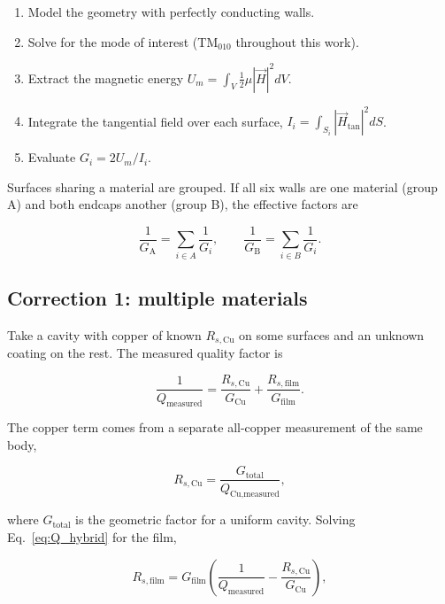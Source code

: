 \begin{enumerate}
    \item Model the geometry with perfectly conducting walls.
    \item Solve for the mode of interest (TM$_{010}$ throughout this work).
    \item Extract the magnetic energy $U_m = \int_V \tfrac{1}{2}\mu|\vec{H}|^2 dV$.
    \item Integrate the tangential field over each surface, $I_i = \int_{S_i} |\vec{H}_\text{tan}|^2 dS$.
    \item Evaluate $G_i = 2U_m / I_i$.
\end{enumerate}

Surfaces sharing a material are grouped. If all six walls are one material (group A) and both endcaps another (group B), the effective factors are

\begin{equation}
\frac{1}{G_\text{A}} = \sum_{i \in A} \frac{1}{G_i}, \qquad \frac{1}{G_\text{B}} = \sum_{i \in B} \frac{1}{G_i}.
\label{eq:G_grouped}
\end{equation}

\subsection{Correction 1: multiple materials}

Take a cavity with copper of known $R_{s,\text{Cu}}$ on some surfaces and an unknown coating on the rest. The measured quality factor is

\begin{equation}
    \frac{1}{Q_\text{measured}} = \frac{R_{s,\text{Cu}}}{G_\text{Cu}} + \frac{R_{s,\text{film}}}{G_\text{film}}.
    \label{eq:Q_hybrid}
\end{equation}

The copper term comes from a separate all-copper measurement of the same body,

\begin{equation}
R_{s,\text{Cu}} = \frac{G_\text{total}}{Q_\text{Cu,measured}},
\label{eq:Rs_Cu}
\end{equation}

where $G_\text{total}$ is the geometric factor for a uniform cavity. Solving Eq.~\ref{eq:Q_hybrid} for the film,

\begin{equation}
R_{s,\text{film}} = G_\text{film} \left(\frac{1}{Q_\text{measured}} - \frac{R_{s,\text{Cu}}}{G_\text{Cu}}\right),
\label{eq:Rs_film}
\end{equation}

